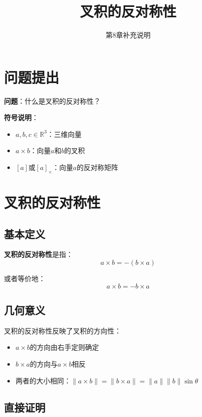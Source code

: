 \documentclass[12pt,a4paper]{article}
\title{叉积的反对称性}
\author{第8章补充说明}
\date{}
\begin{document}
\maketitle

\section{问题提出}

\textbf{问题}：什么是叉积的反对称性？

\textbf{符号说明}：
\begin{itemize}
\item $a, b, c \in \mathbb{R}^3$：三维向量
\item $a \times b$：向量$a$和$b$的叉积
\item $[a]$或$[a]_{\times}$：向量$a$的反对称矩阵
\end{itemize}

\section{叉积的反对称性}

\subsection{基本定义}

\textbf{叉积的反对称性}是指：
\begin{equation}
a \times b = -(b \times a) \tag{1}
\end{equation}

或者等价地：
\begin{equation}
a \times b = -b \times a
\end{equation}

\subsection{几何意义}

叉积的反对称性反映了叉积的方向性：
\begin{itemize}
\item $a \times b$的方向由右手定则确定
\item $b \times a$的方向与$a \times b$相反
\item 两者的大小相同：$\|a \times b\| = \|b \times a\| = \|a\| \|b\| \sin\theta$
\end{itemize}

\subsection{直接证明}
\end{document}
